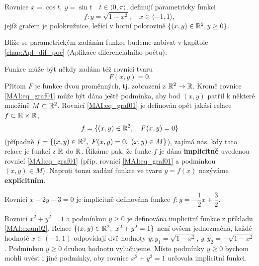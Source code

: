      \begin{example}\label{MAI:exam02}
        Rovnice $x=\cos t,\ y=\sin t\quad t\in\langle0,\pi\rangle$, definují parametricky funkci 
        \begin{equation}
          f: y= \sqrt{1-x^2}, \quad x\in\langle-1,1\rangle,
        \end{equation}
        jejíž grafem je polokružnice, ležící v horní polorovině $\{(x,y)\in\mathbb{R}^2, y\geq0\}$.
             
      \end{example}
      Blíže se parametrickým zadáním funkce budeme zabívat v kapitole \ref{chap:Apl_dif_poc} (Aplikace 
      diferenciálního počtu).
      
      Funkce může být někdy zadána též rovnicí tvaru 
      \begin{equation}\label{MAI:eq_graf01}
        F(x,y) = 0.
      \end{equation}
      Přitom $F$ je funkce dvou proměnných, tj. zobrazení z $\mathbb{R}^2\rightarrow\mathbb{R}$. Kromě rovnice 
      \ref{MAI:eq_graf01} může být dána ještě podmínka, aby bod $(x,y)$ patřil k některé množině 
      $M\subset\mathbb{R}^2$. Rovnicí \ref{MAI:eq_graf01} je definován opět jakási relace 
      $f\subset\mathbb{R}\times\mathbb{R}$,
      \begin{equation}
        f = \{(x,y)\in\mathbb{R}^2,\quad F(x,y)=0 \}
      \end{equation}
      (případně $f = \{(x,y)\in\mathbb{R}^2,\ F(x,y)=0,\ (x,y)\in M \}$), zajímá nás, kdy tato relace je 
      funkcí z $\mathbb{R}$ do $\mathbb{R}$. Říkáme pak, že funke $f$ je dána \textbf{implicitně} uvedenou 
      rovnicí \ref{MAI:eq_graf01} (příp. rovnicí \ref{MAI:eq_graf01} a podmínkou $(x,y)\in M$). 
      Naproti tomu zadání funkce ve tvaru 
      $y=f(x)$ nazýváme \textbf{explicitním}.
      
      \begin{example}\label{MAI:exam03} 
        Rovnicí $x+2y-3=0$ je implicitně definována funkce $f:y=-\dfrac{1}{2}x+\dfrac{3}{2}$.
      \end{example}
      \begin{example}\label{MAI:exam04} 
        Rovnicí $x^2+y^2=1$ a podmínkou $y\geq0$ je definována implicitní funkce z příkladu \ref{MAI:exam02}. 
        Relace $\{(x,y)\in\realset^2;\ x^2+y^2=1\}$ není ovšem jednoznačná, každé hodnotě $x\in(-1,1)$ 
        odpovídají dvě hodnoty $y: y_1=\sqrt{1-x^2}$, $y: y_2=-\sqrt{1-x^2}$. Podmínkou $y\geq0$ druhou 
        hodnotu vylučujeme. Místo podmínky $y\geq0$ bychom mohli uvést i jiné podmínky, aby rovnice 
        $x^2+y^2=1$ určovala implicitní funkci.   
      \end{example}
      
